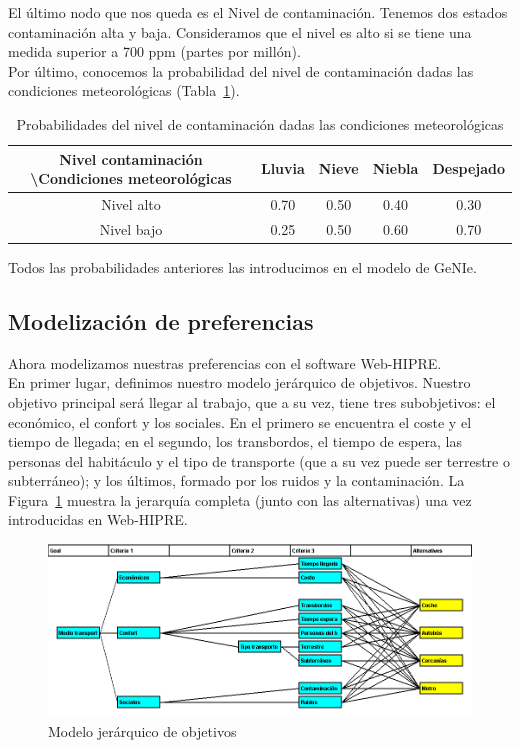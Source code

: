\documentclass[12pt,a4paper,twoside,openright,titlepage,final]{article}
\begin{document}
El último nodo que nos queda es el Nivel de contaminación. Tenemos dos estados contaminación alta y baja. Consideramos que el nivel es alto si se tiene una medida superior a 700 ppm (partes por millón).\\

Por último, conocemos la probabilidad del nivel de contaminación dadas las condiciones meteorológicas (Tabla~\ref{tbl:condicionadas_3}).\\

\begin{table}[htbp!]
	\centering
	\caption{Probabilidades del nivel de contaminación dadas las condiciones meteorológicas}
	\label{tbl:condicionadas_3}
	\begin{tabular}{@{}ccccc@{}}
		\toprule
		Nivel contaminación \textbackslash Condiciones meteorológicas & Lluvia & Nieve & Niebla & Despejado \\ \midrule
		Nivel alto                                                    & 0.70   & 0.50   & 0.40   & 0.30       \\
		Nivel bajo                                                    & 0.25   & 0.50   & 0.60   & 0.70      \\ \bottomrule
	\end{tabular}
\end{table}

Todos las probabilidades anteriores las introducimos en el modelo de GeNIe.

\subsection{Modelización de preferencias}

Ahora modelizamos nuestras preferencias con el software Web-HIPRE.\\

En primer lugar, definimos nuestro modelo jerárquico de objetivos. Nuestro objetivo principal será llegar al trabajo, que a su vez, tiene tres subobjetivos: el económico, el confort y los sociales. En el primero se encuentra el coste y el tiempo de llegada; en el segundo, los transbordos, el tiempo de espera, las personas del habitáculo y el tipo de transporte (que a su vez puede ser terrestre o subterráneo); y los últimos, formado por los ruidos y la contaminación. La Figura~\ref{fig:modelo_jerarquico_objetivos} muestra la jerarquía completa (junto con las alternativas) una vez introducidas en Web-HIPRE.

\begin{figure}[tbph!]
	\centering
	\includegraphics[width=0.9\linewidth]{imagenes/modelo_jerarquico_objetivos}
	\caption{Modelo jerárquico de objetivos}
	\label{fig:modelo_jerarquico_objetivos}
\end{figure}
\end{document}
